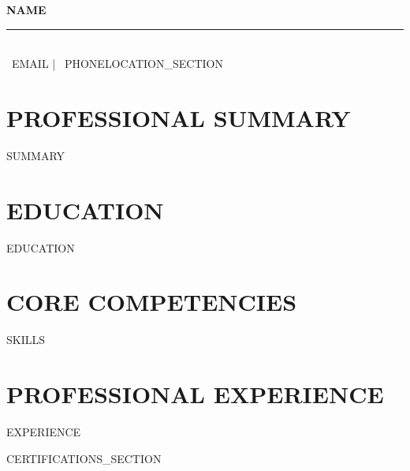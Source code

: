 \documentclass[11pt,a4paper]{article}
\begin{document}
\begin{center}
  {\Huge\bfseries\color{textgray} {{NAME}}}\\[0.4em]
  {\color{sectionblue}\rule{0.3\textwidth}{0.5pt}}\\[0.3em]
  {\small \faEnvelope\ {{EMAIL}} \quad | \quad \faPhone\ {{PHONE}}{{LOCATION_SECTION}}}
\end{center}

\vspace{0.3cm}

\section*{PROFESSIONAL SUMMARY}
\textcolor{textgray}{{{SUMMARY}}}

\section*{EDUCATION}
{{EDUCATION}}

\section*{CORE COMPETENCIES}
\textcolor{textgray}{{{SKILLS}}}

\section*{PROFESSIONAL EXPERIENCE}
{{EXPERIENCE}}

{{CERTIFICATIONS_SECTION}}
\end{document}
